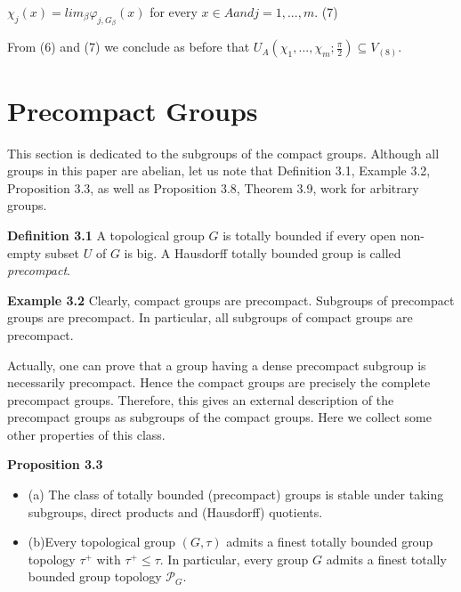 \documentclass[12pt]{article}
\begin{document}
    
        $\chi_j(x) = lim_\beta \varphi_{j,G_\beta} (x)$ for every $x \in A and j = 1,...,m.$  (7)


    From (6) and (7) we conclude as before that $U_A(\chi_1,...,\chi_m; \frac{\pi}{2} ) \subseteq V_{(8)}$.


\section{Precompact Groups}


        This section is dedicated to the subgroups of the compact groups. Although all groups in this paper are abelian, let us
    note that Definition 3.1, Example 3.2, Proposition 3.3, as well as Proposition 3.8, Theorem 3.9, work for arbitrary groups.


    \textbf{Definition 3.1} A topological group $G$ is totally bounded if every open non-empty subset $U$ of $G$ is big. A Hausdorff totally
    bounded group is called \emph{precompact}.


    \textbf{Example 3.2} Clearly, compact groups are precompact. Subgroups of precompact groups are precompact. In particular, all
    subgroups of compact groups are precompact.


        Actually, one can prove that a group having a dense precompact subgroup is necessarily precompact. Hence the compact
    groups are precisely the complete precompact groups. Therefore, this gives an external description of the precompact groups
    as subgroups of the compact groups. Here we collect some other properties of this class.
    
    
    \textbf{Proposition 3.3}
        \begin{itemize}

            \item (a) The class of totally bounded (precompact) groups is stable under taking subgroups, direct products and (Hausdorff) quotients.
            
            \item (b)Every topological group $(G, \tau)$ admits a finest totally bounded group topology $\tau^+$ with $\tau^+ \leqslant \tau$. In particular, every group $G$
            admits a finest totally bounded group topology $\mathcal{P}_G$.

        \end{itemize}
\end{document}
